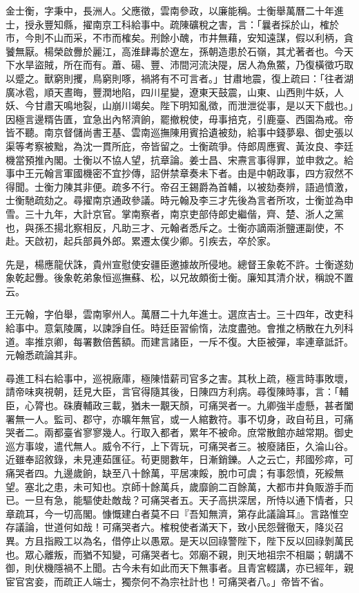 \begin{pinyinscope}
金士衡，字秉中，長洲人。父應徵，雲南參政，以廉能稱。士衡舉萬曆二十年進士，授永豐知縣，擢南京工科給事中。疏陳礦稅之害，言：「曩者採於山，榷於市，今則不山而采，不市而榷矣。刑餘小醜，市井無藉，安知遠謀，假以利柄，貪饕無厭。楊榮啟釁於麗江，高淮肆毒於遼左，孫朝造患於石嶺，其尤著者也。今天下水旱盜賊，所在而有。蕭、碭、豐、沛間河流決隄，居人為魚鱉，乃復橫徵巧取以蹙之。獸窮則攫，鳥窮則啄，禍將有不可言者。」甘肅地震，復上疏曰：「往者湖廣冰雹，順天晝晦，豐潤地陷，四川星變，遼東天鼓震，山東、山西則牛妖，人妖、今甘肅天鳴地裂，山崩川竭矣。陛下明知亂徵，而泄泄從事，是以天下戲也。」因極言邊糈告匱，宜急出內帑濟餉，罷撤稅使，毋事掊克，引鹿臺、西園為戒。帝皆不聽。南京督儲尚書王基、雲南巡撫陳用賓拾遺被劾，給事中錢夢皋、御史張以渠等考察被黜，為沈一貫所庇，帝皆留之。士衡疏爭。侍郎周應賓、黃汝良、李廷機當預推內閣。士衡以不協人望，抗章論。姜士昌、宋燾言事得罪，並申救之。給事中王元翰言軍國機密不宜抄傳，詔併禁章奏未下者。由是中朝政事，四方寂然不得聞。士衡力陳其非便。疏多不行。帝召王錫爵為首輔，以被劾奏辨，語過憤激，士衡馳疏劾之。尋擢南京通政參議。時元翰及李三才先後為言者所攻，士衡並為申雪。三十九年，大計京官。掌南察者，南京吏部侍郎史繼偕，齊、楚、浙人之黨也，與孫丕揚北察相反，凡助三才、元翰者悉斥之。士衡亦謫兩浙鹽運副使，不赴。天啟初，起兵部員外郎。累遷太僕少卿。引疾去，卒於家。

先是，楊應龍伏誅，貴州宣慰使安疆臣邀據故所侵地。總督王象乾不許。士衡遂劾象乾起釁。後象乾弟象恒巡撫蘇、松，以兄故頗銜士衡。廉知其清介狀，稱說不置云。

王元翰，字伯舉，雲南寧州人。萬曆二十九年進士。選庶吉士。三十四年，改吏科給事中。意氣陵厲，以諫諍自任。時廷臣習偷惰，法度盡弛。會推之柄散在九列科道。率推京卿，每署數倍舊額。而建言諸臣，一斥不復。大臣被彈，率連章詆訐。元翰悉疏論其非。

尋進工科右給事中，巡視廠庫，極陳惜薪司官多之害。其秋上疏，極言時事敗壞，請帝味爽視朝，廷見大臣，言官得隨其後，日陳四方利病。尋復陳時事，言：「輔臣，心膂也。硃賡輔政三載，猶未一覯天顏，可痛哭者一。九卿強半虛懸，甚者闔署無一人。監司、郡守，亦曠年無官，或一人綰數符。事不切身，政自茍且，可痛哭者二。兩都臺省寥寥幾人。行取入都者，累年不被命。庶常散館亦越常期。御史巡方事竣，遣代無人。威令不行，上下胥玩，可痛哭者三。被廢諸臣，久淪山谷。近雖奉詔敘錄，未見連茹匯征。茍更閱數年，日漸銷鑠。人之云亡，邦國殄瘁，可痛哭者四。九邊歲餉，缺至八十餘萬，平居凍餒，脫巾可虞；有事怨憤，死綏無望。塞北之患，未可知也。京師十餘萬兵，歲靡餉二百餘萬，大都市井負販游手而已。一旦有急，能驅使赴敵哉？可痛哭者五。天子高拱深居，所恃以通下情者，只章疏耳，今一切高閣。慷慨建白者莫不曰『吾知無濟，第存此議論耳』。言路惟空存議論，世道何如哉！可痛哭者六。榷稅使者滿天下，致小民怨聲徹天，降災召異。方且指殿工以為名，借停止以愚眾。是天以回祿警陛下，陛下反以回祿剝萬民也。眾心離叛，而猶不知變，可痛哭者七。郊廟不親，則天地祖宗不相屬；朝講不御，則伏機隱禍不上聞。古今未有如此而天下無事者。且青宮輟講，亦已經年，親宦官宮妾，而疏正人端士，獨奈何不為宗社計也！可痛哭者八。」帝皆不省。


\end{pinyinscope}
